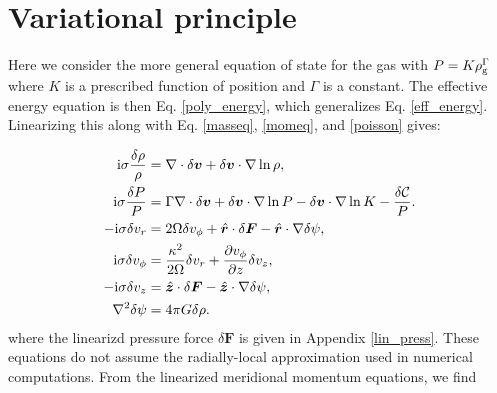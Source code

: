 \section{Variational principle}\label{var_prin}

Here we consider the more general equation of state for the gas with
$P = K \rho_\mathrm{g}^{\Gamma}$ where $K$ is a prescribed function of position
and $\Gamma$ is a constant. The effective energy equation is then
Eq. \ref{poly_energy}, which generalizes
Eq. \ref{eff_energy}. Linearizing this along with Eq. \ref{masseq},
\ref{momeq},  and \ref{poisson} gives:  


\begin{align}
  \mathrm{i}\sigma\frac{\delta\rho}{\rho} &= \nabla\cdot\delta\bm{v} +
  \delta\bm{v}\cdot\nabla\ln{\rho},\label{lin_mass_full}\\
   \mathrm{i}\sigma\frac{\delta P}{P} &= \Gamma \nabla\cdot\delta\bm{v} +
  \delta\bm{v}\cdot\nabla\ln{P} - \delta\bm{v}\cdot\nabla\ln{K} - \frac{\delta\mathcal{C}}{P}.\label{lin_energy_full}\\
  -\mathrm{i}\sigma\delta v_r  &= 2\Omega\delta v_\phi + 
  \hat{\bm{r}} \cdot \delta\bm{F} -  \hat{\bm{r}} \cdot \nabla\delta\psi ,\\
  \mathrm{i}\sigma\delta v_\phi &= \frac{\kappa^2}{2\Omega}\delta v_r + \frac{\partial
    v_\phi}{\partial z}\delta v_z,\\
  -\mathrm{i}\sigma\delta v_z &=  \hat{\bm{z}} \cdot \delta\bm{F}  -  \hat{\bm{z}} \cdot \nabla\delta\psi, \\ 
\nabla^2 \delta\psi & = 4\pi G \delta\rho. 
\end{align}  
where the linearizd pressure force $\delta \bm{F}$ is given in
Appendix \ref{lin_press}. These equations do not assume the
radially-local approximation used in numerical computations. From the
linearized meridional momentum equations, we find  

